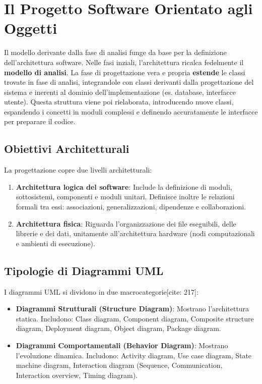 \documentclass[12pt,a4paper,oneside]{book}
\begin{document}
\section{Il Progetto Software Orientato agli Oggetti}

Il modello derivante dalla fase di analisi funge da base per la definizione dell'architettura software. Nelle fasi inziali, l'architettura ricalca fedelmente il \textbf{modello di analisi}. 
La fase di progettazione vera e propria \textbf{estende} le classi trovate in fase di analisi, integrandole con classi derivanti dalla progettazione del sistema e inerenti al dominio dell'implementazione (es. database, interfacce utente). 
Questa struttura viene poi rielaborata, introducendo nuove classi, espandendo i concetti in moduli complessi e definendo accuratamente le interfacce per preparare il codice.

\subsection{Obiettivi Architetturali}
La progettazione copre due livelli architetturali:
\begin{enumerate}
    \item \textbf{Architettura logica del software}: Include la definizione di moduli, sottosistemi, componenti e moduli unitari. Definisce inoltre le relazioni formali tra essi: associazioni, generalizzazioni, dipendenze e collaborazioni.
    \item \textbf{Architettura fisica}: Riguarda l'organizzazione dei file eseguibili, delle librerie e dei dati, unitamente all'architettura hardware (nodi computazionali e ambienti di esecuzione).
\end{enumerate}

\subsection{Tipologie di Diagrammi UML}
I diagrammi UML si dividono in due macrocategorie[cite: 217]:
\begin{itemize}
    \item \textbf{Diagrammi Strutturali (Structure Diagram)}: Mostrano l'architettura statica. Includono: Class diagram, Component diagram, Composite structure diagram, Deployment diagram, Object diagram, Package diagram.
    \item \textbf{Diagrammi Comportamentali (Behavior Diagram)}: Mostrano l'evoluzione dinamica. Includono: Activity diagram, Use case diagram, State machine diagram, Interaction diagram (Sequence, Communication, Interaction overview, Timing diagram).
\end{itemize}
\end{document}
